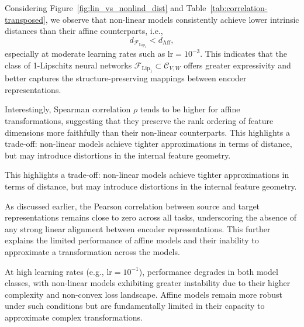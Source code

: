 \begin{table}[h]
\begin{tabular}{l c ccccccc}
\bottomrule
\end{tabular}
\end{table}

Considering Figure~\ref{fig:lin_vs_nonlind_dist} and Table~\ref{tab:correlation-transposed}, we observe that non-linear models consistently achieve lower intrinsic distances than their affine counterparts, i.e.,
\[
d_{\mathcal{F}_{\mathrm{Lip}_1}} < d_{\mathrm{Aff}},
\]
especially at moderate learning rates such as \( \text{lr} = 10^{-3} \).  
This indicates that the class of 1-Lipschitz neural networks \( \mathcal{F}_{\text{Lip}_1} \subset \mathcal{C}_{V,W} \) offers greater expressivity and better captures the structure-preserving mappings between encoder representations.

Interestingly, Spearman correlation \( \rho \) tends to be higher for affine transformations, suggesting that they preserve the rank ordering of feature dimensions more faithfully than their non-linear counterparts.  
This highlights a trade-off: non-linear models achieve tighter approximations in terms of distance, but may introduce distortions in the internal feature geometry.

This highlights a trade-off: non-linear models achieve tighter approximations in terms of distance, but may introduce distortions in the internal feature geometry.

As discussed earlier, the Pearson correlation between source and target representations remains close to zero across all tasks, underscoring the absence of any strong linear alignment between encoder representations.  
This further explains the limited performance of affine models and their inability to approximate a transformation across the models.


At high learning rates (e.g., \( \text{lr} = 10^{-1} \)), performance degrades in both model classes, with non-linear models exhibiting greater instability due to their higher complexity and non-convex loss landscape.  
Affine models remain more robust under such conditions but are fundamentally limited in their capacity to approximate complex transformations.



